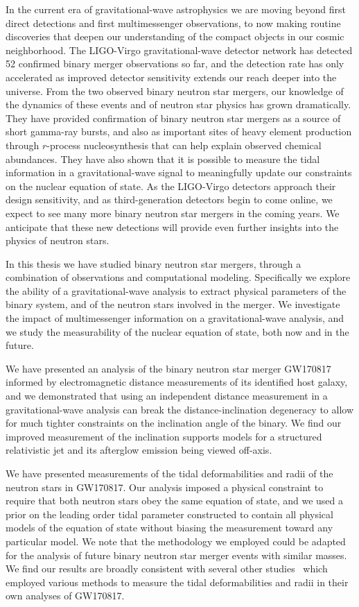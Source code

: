In the current era of gravitational-wave astrophysics we are moving beyond first direct detections and first multimessenger observations, to now making routine discoveries that deepen our understanding of the compact objects in our cosmic neighborhood. The LIGO-Virgo gravitational-wave detector network has detected 52 confirmed binary merger observations so far, and the detection rate has only accelerated as improved detector sensitivity extends our reach deeper into the universe. From the two observed binary neutron star mergers, our knowledge of the dynamics of these events and of neutron star physics has grown dramatically. They have provided confirmation of binary neutron star mergers as a source of short gamma-ray bursts, and also as important sites of heavy element production through $r$-process nucleosynthesis that can help explain observed chemical abundances. They have also shown that it is possible to measure the tidal information in a gravitational-wave signal to meaningfully update our constraints on the nuclear equation of state. As the LIGO-Virgo detectors approach their design sensitivity, and as third-generation detectors begin to come online, we expect to see many more binary neutron star mergers in the coming years. We anticipate that these new detections will provide even further insights into the physics of neutron stars.

In this thesis we have studied binary neutron star mergers, through a combination of observations and computational modeling. Specifically we explore the ability of a gravitational-wave analysis to extract physical parameters of the binary system, and of the neutron stars involved in the merger. We investigate the impact of multimessenger information on a gravitational-wave analysis, and we study the measurability of the nuclear equation of state, both now and in the future.

We have presented an analysis of the binary neutron star merger GW170817 informed by electromagnetic distance measurements of its identified host galaxy, and we demonstrated that using an independent distance measurement in a gravitational-wave analysis can break the distance-inclination degeneracy to allow for much tighter constraints on the inclination angle of the binary. We find our improved measurement of the inclination supports models for a structured relativistic jet and its afterglow emission being viewed off-axis.

We have presented measurements of the tidal deformabilities and radii of the neutron stars in GW170817. Our analysis imposed a physical constraint to require that both neutron stars obey the same equation of state, and we used a prior on the leading order tidal parameter constructed to contain all physical models of the equation of state without biasing the measurement toward any particular model. We note that the methodology we employed could be adapted for the analysis of future binary neutron star merger events with similar masses. We find our results are broadly consistent with several other studies~\cite{Abbott:2018exr,Radice:2018ozg,Coughlin:2018fis,Capano:2019eae} which employed various methods to measure the tidal deformabilities and radii in their own analyses of GW170817.

